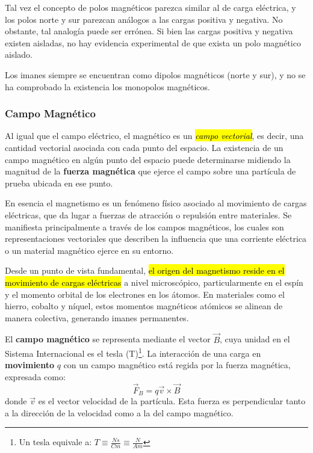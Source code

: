Tal vez el concepto de polos magnéticos parezca similar al de carga eléctrica, y los polos norte y sur parezcan análogos a las cargas positiva y negativa. No obstante, tal analogía puede ser errónea. Si bien las cargas positiva y negativa existen aisladas, no hay evidencia experimental de que exista un polo magnético aislado.

Los imanes siempre se encuentran como dipolos magnéticos (norte y sur), y no se ha comprobado la existencia los monopolos magnéticos.

\subsubsection{Campo Magnético}

Al igual que el campo eléctrico, el magnético es un \hl{\textit{campo vectorial}}, es decir, una cantidad vectorial asociada con cada punto del espacio. La existencia de un campo magnético en algún punto del espacio puede determinarse midiendo la magnitud de la \textbf{fuerza magnética} que ejerce el campo sobre una partícula de prueba ubicada en ese punto.

En esencia el magnetismo es un fenómeno físico asociado al movimiento de cargas eléctricas, que da lugar a fuerzas de atracción o repulsión entre materiales. Se manifiesta principalmente a través de los campos magnéticos, los cuales son representaciones vectoriales que describen la influencia que una corriente eléctrica o un material magnético ejerce en su entorno.

Desde un punto de vista fundamental, \hl{el origen del magnetismo reside en el movimiento de cargas eléctricas} a nivel microscópico, particularmente en el espín y el momento orbital de los electrones en los átomos. En materiales como el hierro, cobalto y níquel, estos momentos magnéticos atómicos se alinean de manera colectiva, generando imanes permanentes.

El \textbf{campo magnético} se representa mediante el vector \(\vec{B}\), cuya unidad en el Sistema Internacional es el tesla (T)\footnote{Un tesla equivale a: \(T \equiv \frac{Ns}{Cm} \equiv \frac{N}{Am}\)}. La interacción de una carga en \textbf{movimiento} \(q\) con un campo magnético está regida por la fuerza magnética, expresada como:
\begin{equation}
  \vec{F}_B = q\vec{v} \times \vec{B}
  \label{eq:fuerza_magnética}
\end{equation}
donde \(\vec{v}\) es el vector velocidad de la partícula. Esta fuerza es perpendicular tanto a la dirección de la velocidad como a la del campo magnético.

